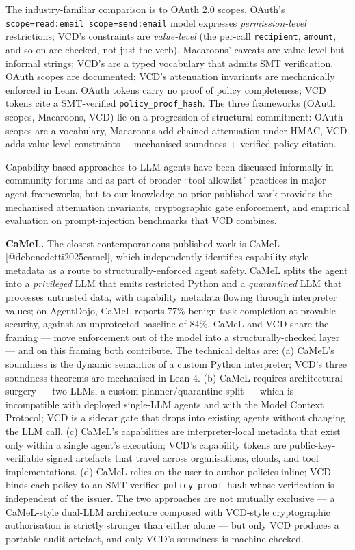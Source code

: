 The industry-familiar comparison is to OAuth 2.0 scopes. OAuth's
\texttt{scope=read:email\ scope=send:email} model expresses
\emph{permission-level} restrictions; VCD's constraints are
\emph{value-level} (the per-call \texttt{recipient}, \texttt{amount},
and so on are checked, not just the verb). Macaroons' caveats are
value-level but informal strings; VCD's are a typed vocabulary that
admits SMT verification. OAuth scopes are documented; VCD's attenuation
invariants are mechanically enforced in Lean. OAuth tokens carry no
proof of policy completeness; VCD tokens cite a SMT-verified
\texttt{policy\_proof\_hash}. The three frameworks (OAuth scopes,
Macaroons, VCD) lie on a progression of structural commitment: OAuth
scopes are a vocabulary, Macaroons add chained attenuation under HMAC,
VCD adds value-level constraints + mechanised soundness + verified
policy citation.

Capability-based approaches to LLM agents have been discussed informally
in community forums and as part of broader ``tool allowlist'' practices
in major agent frameworks, but to our knowledge no prior published work
provides the mechanised attenuation invariants, cryptographic gate
enforcement, and empirical evaluation on prompt-injection benchmarks
that VCD combines.

\textbf{CaMeL.} The closest contemporaneous published work is CaMeL
{[}@debenedetti2025camel{]}, which independently identifies
capability-style metadata as a route to structurally-enforced agent
safety. CaMeL splits the agent into a \emph{privileged} LLM that emits
restricted Python and a \emph{quarantined} LLM that processes untrusted
data, with capability metadata flowing through interpreter values; on
AgentDojo, CaMeL reports 77\% benign task completion at provable
security, against an unprotected baseline of 84\%. CaMeL and VCD share
the framing --- move enforcement out of the model into a
structurally-checked layer --- and on this framing both contribute. The
technical deltas are: (a) CaMeL's soundness is the dynamic semantics of
a custom Python interpreter; VCD's three soundness theorems are
mechanised in Lean 4. (b) CaMeL requires architectural surgery --- two
LLMs, a custom planner/quarantine split --- which is incompatible with
deployed single-LLM agents and with the Model Context Protocol; VCD is a
sidecar gate that drops into existing agents without changing the LLM
call. (c) CaMeL's capabilities are interpreter-local metadata that exist
only within a single agent's execution; VCD's capability tokens are
public-key-verifiable signed artefacts that travel across organisations,
clouds, and tool implementations. (d) CaMeL relies on the user to author
policies inline; VCD binds each policy to an SMT-verified
\texttt{policy\_proof\_hash} whose verification is independent of the
issuer. The two approaches are not mutually exclusive --- a CaMeL-style
dual-LLM architecture composed with VCD-style cryptographic
authorisation is strictly stronger than either alone --- but only VCD
produces a portable audit artefact, and only VCD's soundness is
machine-checked.

